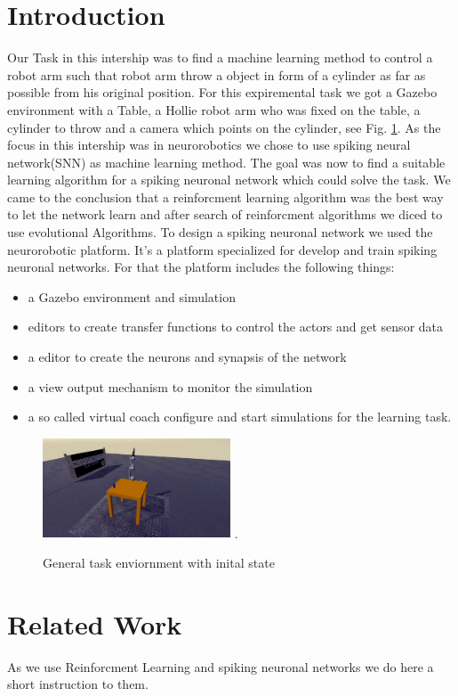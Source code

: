 \section{Introduction}
\label{sec:introtduction}
Our Task in this intership was to find a machine learning method to control a robot arm such that robot arm throw a object in form of a cylinder as far as possible from his original position. For this expiremental task we got a Gazebo environment with a Table, a Hollie robot arm who was fixed on the table, a cylinder to throw and a camera which points on the cylinder, see Fig. \ref{init_state}.
As the focus in this intership was in neurorobotics we chose to use spiking neural network(SNN) as machine learning method. The goal was now to find a suitable learning algorithm for a spiking neuronal network which could solve the task. We came to the conclusion that a reinforcment learning algorithm was the best way to let the network learn and after search of reinforcment algorithms we diced to use evolutional Algorithms. 
To design a spiking neuronal network we used the neurorobotic platform. It's a platform specialized for develop and train spiking neuronal networks. For that the platform includes the following things:
 \begin{itemize}
\item a Gazebo environment and simulation
\item editors to create transfer functions to control the actors and get sensor data
\item a editor to create the neurons and synapsis of the network
\item a view output mechanism to monitor the simulation
\item a so called virtual coach configure and start simulations for the learning task.
\end{itemize} 
\begin{figure}[H]
	\centering
	\includegraphics[width=2.2in]{img/init_state.png}
	\DeclareGraphicsExtensions.
	\caption{General task enviornment with inital state }
	\label{init_state}
\end{figure}
\section{Related Work}
As we use Reinforcment Learning and spiking neuronal networks we do here a short instruction to them.
